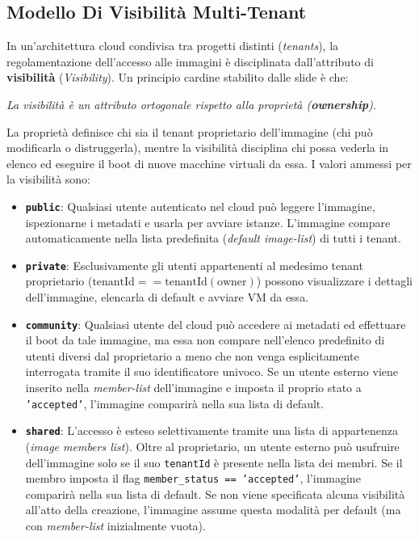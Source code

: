 \documentclass[11pt, a4paper]{article}
\begin{document}
\subsection{Modello Di Visibilità Multi-Tenant}

In un'architettura cloud condivisa tra progetti distinti (\emph{tenants}), la regolamentazione dell'accesso alle immagini è disciplinata dall'attributo di \textbf{visibilità} (\emph{Visibility}). Un principio cardine stabilito dalle slide è che:
\begin{center}
\emph{La visibilità è un attributo ortogonale rispetto alla proprietà (\textbf{ownership}).}
\end{center}
La proprietà definisce chi sia il tenant proprietario dell'immagine (chi può modificarla o distruggerla), mentre la visibilità disciplina chi possa vederla in elenco ed eseguire il boot di nuove macchine virtuali da essa. I valori ammessi per la visibilità sono:

\begin{itemize}
    \item \textbf{\texttt{public}}: Qualsiasi utente autenticato nel cloud può leggere l'immagine, ispezionarne i metadati e usarla per avviare istanze. L'immagine compare automaticamente nella lista predefinita (\emph{default image-list}) di tutti i tenant.
    \item \textbf{\texttt{private}}: Esclusivamente gli utenti appartenenti al medesimo tenant proprietario ($\text{tenantId} == \text{tenantId}(\text{owner})$) possono visualizzare i dettagli dell'immagine, elencarla di default e avviare VM da essa.
    \item \textbf{\texttt{community}}: Qualsiasi utente del cloud può accedere ai metadati ed effettuare il boot da tale immagine, ma essa non compare nell'elenco predefinito di utenti diversi dal proprietario a meno che non venga esplicitamente interrogata tramite il suo identificatore univoco. Se un utente esterno viene inserito nella \emph{member-list} dell'immagine e imposta il proprio stato a \texttt{'accepted'}, l'immagine comparirà nella sua lista di default.
    \item \textbf{\texttt{shared}}: L'accesso è esteso selettivamente tramite una lista di appartenenza (\emph{image members list}). Oltre al proprietario, un utente esterno può usufruire dell'immagine solo se il suo \texttt{tenantId} è presente nella lista dei membri. Se il membro imposta il flag \texttt{member\_status == 'accepted'}, l'immagine comparirà nella sua lista di default. Se non viene specificata alcuna visibilità all'atto della creazione, l'immagine assume questa modalità per default (ma con \emph{member-list} inizialmente vuota).
\end{itemize}
\end{document}
